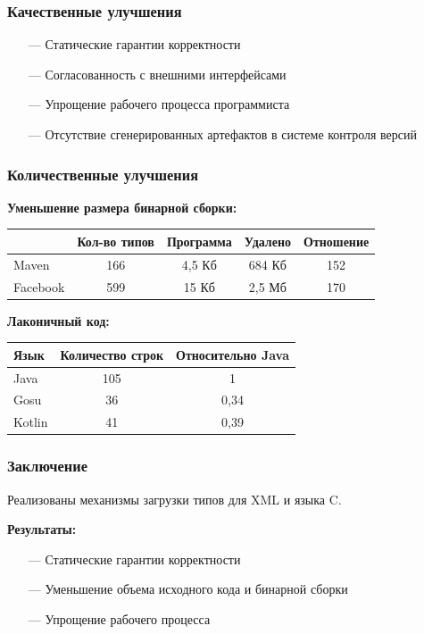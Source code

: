 \documentclass[12pt]{beamer}
\newcommand{\nl}{\vspace{\baselineskip}}
\begin{document}
\begin{frame}\frametitle{Качественные улучшения}
\linespread{1.1}
\begin{large}
    \begin{itemize}
        \item[---] Статические гарантии корректности
        \item[---] Согласованность с внешними интерфейсами
        \item[---] Упрощение рабочего процесса программиста
        \item[---] Отсутствие сгенерированных артефактов в системе контроля версий
    \end{itemize}
\end{large}
\linespread{1}
\end{frame}

\begin{frame}\frametitle{Количественные улучшения}
\begin{small}
\textbf{Уменьшение размера бинарной сборки:}
\begin{table}[!h]
    \begin{tabular}{ | l | c | c | c | c | }
    \hline
        & Кол-во типов & Программа & Удалено & Отношение \\ \hline
    Maven      & 166   & 4,5 Кб  & 684 Кб & 152 \\ \hline
    Facebook   & 599   & 15 Кб  & 2,5 Мб & 170 \\ \hline
    \end{tabular}
\end{table}

\textbf{Лаконичный код:}
\begin{table}[!h]
    \begin{tabular}{ | l | c | c | }
    \hline
    Язык    & Количество строк & Относительно Java \\ \hline
    Java    & 105   & 1 \\ \hline
    Gosu    & 36    & 0,34  \\ \hline
    Kotlin  & 41    & 0,39 \\
    \hline
    \end{tabular}
\end{table}

\end{small}
\end{frame}

\begin{frame}\frametitle{Заключение}
Реализованы механизмы загрузки типов для XML и языка C. \nl

\textbf{Результаты:}
    \begin{itemize}
        \item[---] Статические гарантии корректности
        \item[---] Уменьшение объема исходного кода и бинарной сборки
        \item[---] Упрощение рабочего процесса
    \end{itemize}
\end{frame}
\end{document}
